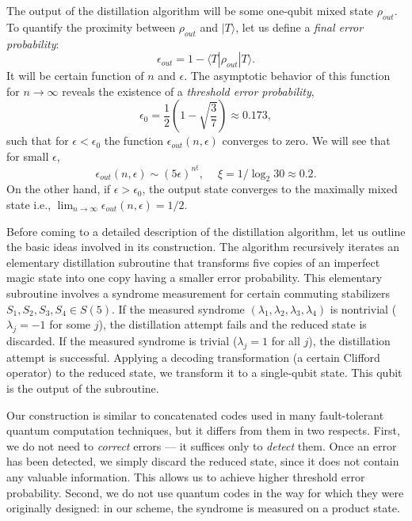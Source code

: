 \documentclass[pra,twocolumn,showpacs]{revtex4}
\newcommand{\la}{\langle}
\newcommand{\ra}{\rangle}
\newcommand{\ep}{\epsilon}
\begin{document}
The output of the distillation algorithm will be some one-qubit
mixed state $\rho_{out}$. To quantify the proximity between $\rho_{out}$
and $|T\ra$, let us define a {\it final  error probability}:
\[
\ep_{out}=1-\la T|\rho_{out}|T\ra.
\]
It will be certain function of $n$ and $\ep$. The asymptotic behavior of this
function for $n\to\infty$ reveals the existence of a {\it threshold error
probability},
\[
\ep_0 = \frac12 \left(1-\sqrt{\frac37}\right) \approx 0.173,
\]
such that for $\ep<\ep_0$ the function $\ep_{out}(n,\ep)$ converges to zero.
We will see that for small $\ep$,
\begin{equation}\label{eoutT}
\ep_{out}(n,\ep) \sim \left(5\ep\right)^{\displaystyle n^\xi}, \quad\
\xi=1/\log_2{30} \approx 0.2.
\end{equation}
On the other hand, if $\ep>\ep_0$, the output state converges to the maximally
mixed state i.e., $\lim_{n\to \infty} \ep_{out}(n,\ep) =1/2$.

Before coming to a detailed description of the distillation algorithm, let us
outline the basic ideas involved in its construction.  The algorithm
recursively iterates an elementary distillation subroutine that transforms
five copies of an imperfect magic state into one copy having a smaller error
probability. This elementary subroutine involves a syndrome measurement for
certain commuting stabilizers $S_1, S_2, S_3, S_4 \in S(5)$.  If the measured
syndrome $(\lambda_1,\lambda_2,\lambda_3,\lambda_4)$ is nontrivial
($\lambda_j=-1$ for some $j$), the distillation attempt fails and the reduced
state is discarded.  If the measured syndrome is trivial ($\lambda_j=1$ for
all $j$), the distillation attempt is successful. Applying a decoding
transformation (a certain Clifford operator) to the reduced state, we
transform it to a single-qubit state. This qubit is the output of the
subroutine.

Our construction is similar to concatenated codes used in many fault-tolerant
quantum computation techniques, but it differs from them in two respects.
First, we do not need to {\it correct} errors --- it suffices only to {\it
detect} them. Once an error has been detected, we simply discard the reduced
state, since it does not contain any valuable information. This allows us to
achieve higher threshold error probability. Second, we do not use quantum
codes in the way for which they were originally designed: in our scheme, the
syndrome is measured on a product state.
\end{document}
